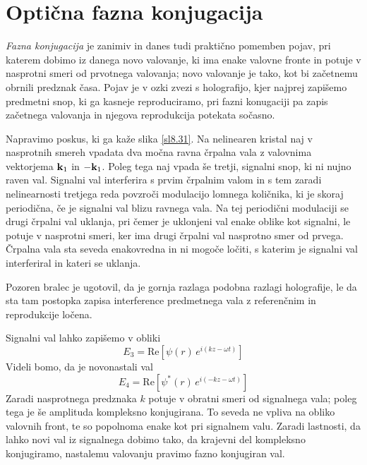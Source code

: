 \section{Optična fazna konjugacija}

\textit{Fazna konjugacija} je zanimiv in danes tudi praktično pomemben
pojav, pri katerem dobimo iz danega novo valovanje, ki ima enake valovne
fronte in potuje v nasprotni smeri od prvotnega valovanja; novo valovanje
je tako, kot bi začetnemu obrnili predznak časa. Pojav je v ozki zvezi
s holografijo, kjer najprej zapišemo predmetni snop, ki ga kasneje
reproduciramo, pri fazni konugaciji pa zapis začetnega valovanja in njegova
reprodukcija potekata sočasno.

Napravimo poskus, ki ga kaže slika \ref{sl8.31}. Na nelinearen kristal
naj v nasprotnih smereh vpadata dva močna ravna črpalna vala z valovnima
vektorjema ${\bf k}_{1}$ in $-{\bf k}_{1}$. Poleg tega naj vpada
še tretji, signalni snop, ki ni nujno raven val. Signalni val interferira
s prvim črpalnim valom in s tem zaradi nelinearnosti tretjega reda
povzroči modulacijo lomnega količnika, ki je skoraj periodična, če
je signalni val blizu ravnega vala. Na tej periodični modulaciji se
drugi črpalni val uklanja, pri čemer je uklonjeni val enake oblike
kot signalni, le potuje v nasprotni smeri, ker ima drugi črpalni val
nasprotno smer od prvega. Črpalna vala sta seveda enakovredna in ni
mogoče ločiti, s katerim je signalni val interferiral in kateri se
uklanja.

Pozoren bralec je ugotovil, da je gornja razlaga podobna razlagi holografije,
le da sta tam postopka zapisa interference predmetnega vala z referenčnim
in reprodukcije ločena.

Signalni val lahko zapišemo v obliki 
\begin{equation}
E_{3}=\mathrm{Re}\left[\psi\left(r\right)\, e^{i\left(kz-\omega t\right)}\right]\label{8.97}
\end{equation}
 Videli bomo, da je novonastali val 
\begin{equation}
E_{4}=\mathrm{Re}\left[\psi^{*}\left(r\right)\, e^{i\left(-kz-\omega t\right)}\right]\label{8.98}
\end{equation}
 Zaradi nasprotnega predznaka $k$ potuje v obratni smeri od signalnega
vala; poleg tega je še amplituda kompleksno konjugirana. To seveda
ne vpliva na obliko valovnih front, te so popolnoma enake kot pri signalnem
valu. Zaradi lastnosti, da lahko novi val iz signalnega dobimo tako,
da krajevni del kompleksno konjugiramo, nastalemu valovanju pravimo fazno
konjugiran val.

